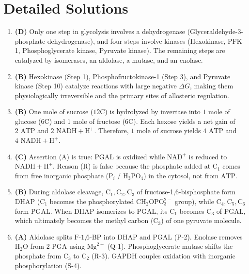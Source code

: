 \documentclass[11pt, a4paper]{article}
\begin{document}
\section*{Detailed Solutions}

\begin{enumerate}[label=\textbf{\arabic*.}]

\item \textbf{(D)} Only one step in glycolysis involves a dehydrogenase (Glyceraldehyde-3-phosphate dehydrogenase), and four steps involve kinases (Hexokinase, PFK-1, Phosphoglycerate kinase, Pyruvate kinase). The remaining steps are catalyzed by isomerases, an aldolase, a mutase, and an enolase.

\item \textbf{(B)} Hexokinase (Step 1), Phosphofructokinase-1 (Step 3), and Pyruvate kinase (Step 10) catalyze reactions with large negative $\Delta G$, making them physiologically irreversible and the primary sites of allosteric regulation.

\item \textbf{(B)} One mole of sucrose ($12\text{C}$) is hydrolyzed by invertase into $1\text{ mole}$ of glucose ($6\text{C}$) and $1\text{ mole}$ of fructose ($6\text{C}$). Each hexose yields a net gain of $2\text{ ATP}$ and $2\text{ NADH} + \text{H}^+$. Therefore, $1\text{ mole}$ of sucrose yields $4\text{ ATP}$ and $4\text{ NADH} + \text{H}^+$.

\item \textbf{(C)} Assertion (A) is true: $\text{PGAL}$ is oxidized while $\text{NAD}^+$ is reduced to $\text{NADH} + \text{H}^+$. Reason (R) is false because the phosphate added at $\text{C}_1$ comes from free inorganic phosphate ($\text{P}_i$ / $\text{H}_3\text{PO}_4$) in the cytosol, not from $\text{ATP}$.

\item \textbf{(B)} During aldolase cleavage, $\text{C}_1, \text{C}_2, \text{C}_3$ of fructose-1,6-bisphosphate form $\text{DHAP}$ ($\text{C}_1$ becomes the phosphorylated $\text{CH}_2\text{OPO}_3^{2-}$ group), while $\text{C}_4, \text{C}_5, \text{C}_6$ form $\text{PGAL}$. When $\text{DHAP}$ isomerizes to $\text{PGAL}$, its $\text{C}_1$ becomes $\text{C}_3$ of $\text{PGAL}$, which ultimately becomes the methyl carbon ($\text{C}_3$) of one pyruvate molecule.

\item \textbf{(A)} Aldolase splits $\text{F-1,6-BP}$ into $\text{DHAP}$ and $\text{PGAL}$ (P-2). Enolase removes $\text{H}_2\text{O}$ from $\text{2-PGA}$ using $\text{Mg}^{2+}$ (Q-1). Phosphoglycerate mutase shifts the phosphate from $\text{C}_3$ to $\text{C}_2$ (R-3). $\text{GAPDH}$ couples oxidation with inorganic phosphorylation (S-4).


\end{enumerate}
\end{document}

